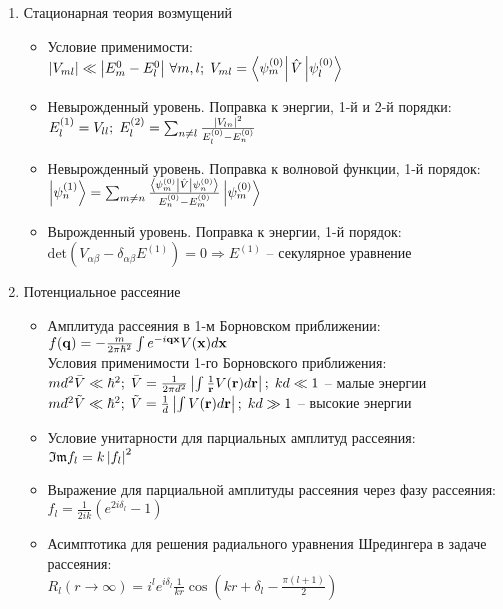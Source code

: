 \begin{enumerate}[label=\textbf{\underline{\arabic*.}}]
\item Стационарная теория возмущений  \begin{itemize}
            \item Условие применимости: \\
            $ \abs{V_{ml}} \ll \abs{E_m^0 - E_l^0}\, \forall m,l;\; V_{ml}=\matrixel{\psi_m^{(0)}}{\hat{V}}{\psi_l^{(0)}} $
            \item Невырожденный уровень. Поправка к энергии, 1-й и 2-й порядки: \\
            $ E_l^{(1)} = V_{ll};\; E_l^{(2)} = \sum_{n \neq l} \frac{\left| V_{ln} \right|^2}{E_l^{(0)} - E_n^{(0)}} $
            \item Невырожденный уровень. Поправка к волновой функции, 1-й порядок: \\
            $ \ket{\psi_n^{(1)}} = \sum_{m \neq n} \frac{\matrixel{\psi_m^{(0)}}{\hat{V}}{\psi_n^{(0)}}}{E_n^{(0)} - E_m^{(0)}}\ket{\psi^{(0)}_m} $
            \item Вырожденный уровень. Поправка к энергии, 1-й порядок: \\
            $ \text{det}(V_{\alpha\beta} - \delta_{\alpha\beta}E^{(1)})=0 \Rightarrow E^{(1)} $ -- секулярное уравнение

        \end{itemize}
\item Потенциальное рассеяние  \begin{itemize}
            \item Амплитуда рассеяния в 1-м Борновском приближении: \\
            $ f(\mathbf{q}) = -\frac{m}{2\pi\hbar^2}\int e^{-i\mathbf{q}\mathbf{x}} V(\mathbf{x})d\mathbf{x} $ \\
            Условия применимости 1-го Борновского приближения: \\
            $ md^2\bar{V} \ll \hbar^2;\; \bar{V} = \frac1{2\pi d^2} \left| \int \frac1{\mathbf{r}}V(\mathbf{r})d\mathbf{r} \right|;\; kd \ll 1 $ -- малые энергии \\
            $ md^2\tilde{V} \ll \hbar^2;\; \tilde{V} = \frac1{d} \left| \int V(\mathbf{r})d\mathbf{r} \right|;\; kd \gg 1 $ -- высокие энергии \\
            \item Условие унитарности для парциальных амплитуд рассеяния: \\
            $ \mathfrak{Im}{f_l} = k \left| f_l \right|^2 $
            \item Выражение для парциальной амплитуды рассеяния через фазу рассеяния: \\
            $ f_l = \frac1{2ik}(e^{2i\delta_l} - 1) $
            \item Асимптотика для решения радиального уравнения Шредингера в задаче рассеяния: \\
            $ R_l(r \rightarrow \infty) = i^l e^{i\delta_l} \frac1{kr} \cos(kr+\delta_l - \frac{\pi(l+1)}{2}) $


\end{itemize}
\end{enumerate}
